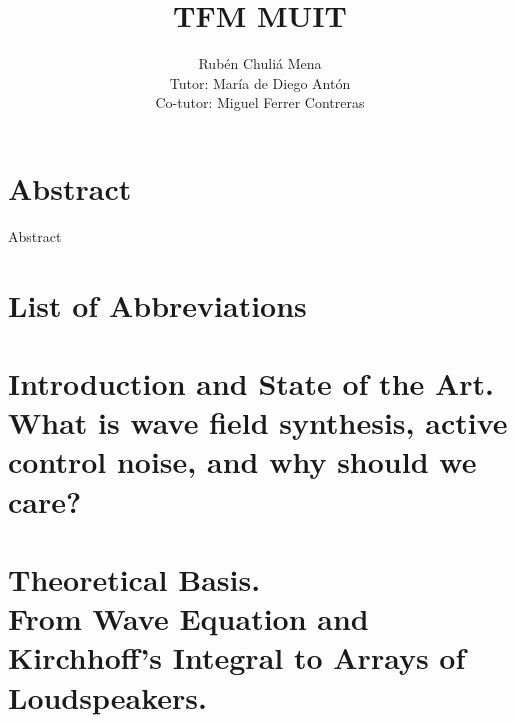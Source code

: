 \documentclass[10pt,a4paper]{report}
\providecommand\phantomsection{}
\begin{document}
\author{
	Rub\'{e}n Chuli\'{a} Mena \\
	Tutor: Mar\'ia de Diego Ant\'on \\
	Co-tutor: Miguel Ferrer Contreras
}
\title{TFM MUIT}
\date{}
\maketitle
{}

\phantomsection %
\tableofcontents

\newpage

\phantomsection
{}
\chapter*{Abstract}
Abstract

\newpage

\phantomsection
\listoffigures

\newpage

\phantomsection
{}
\chapter*{List of Abbreviations}


\newpage
\setcounter{page}{1}
\chapter[Introduction and State of the Art]{Introduction and State of the Art.\\What is wave field synthesis, active control noise, and why should we care?}


\chapter[Theoretical Basis]{Theoretical Basis.\\From Wave Equation and Kirchhoff's Integral to Arrays of Loudspeakers.}



\end{document}
